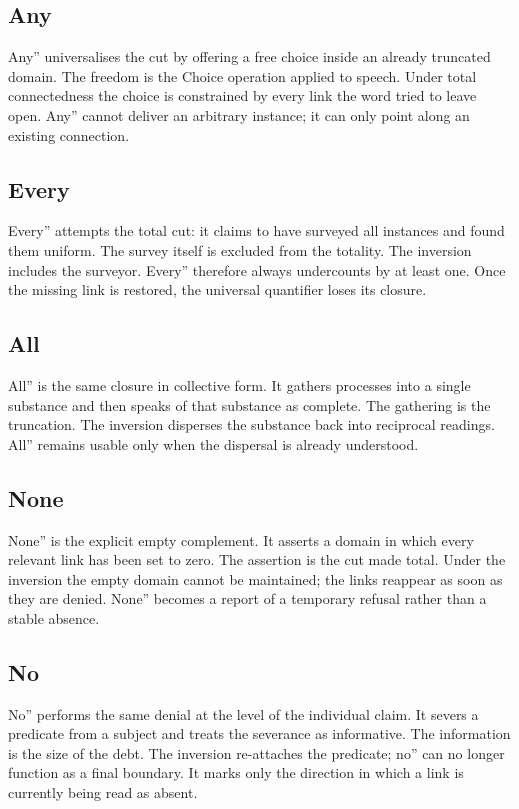 \documentclass[11pt,a4paper]{article}
\begin{document}
\subsection{Any} Any'' universalises the cut by offering a free choice inside an already truncated domain. The freedom is the Choice operation applied to speech. Under total connectedness the choice is constrained by every link the word tried to leave open. Any'' cannot deliver an arbitrary instance; it can only point along an existing connection.

\subsection{Every} Every'' attempts the total cut: it claims to have surveyed all instances and found them uniform. The survey itself is excluded from the totality. The inversion includes the surveyor. Every'' therefore always undercounts by at least one. Once the missing link is restored, the universal quantifier loses its closure.

\subsection{All} All'' is the same closure in collective form. It gathers processes into a single substance and then speaks of that substance as complete. The gathering is the truncation. The inversion disperses the substance back into reciprocal readings. All'' remains usable only when the dispersal is already understood.

\subsection{None} None'' is the explicit empty complement. It asserts a domain in which every relevant link has been set to zero. The assertion is the cut made total. Under the inversion the empty domain cannot be maintained; the links reappear as soon as they are denied. None'' becomes a report of a temporary refusal rather than a stable absence.

\subsection{No} No'' performs the same denial at the level of the individual claim. It severs a predicate from a subject and treats the severance as informative. The information is the size of the debt. The inversion re-attaches the predicate; no'' can no longer function as a final boundary. It marks only the direction in which a link is currently being read as absent.
\end{document}
